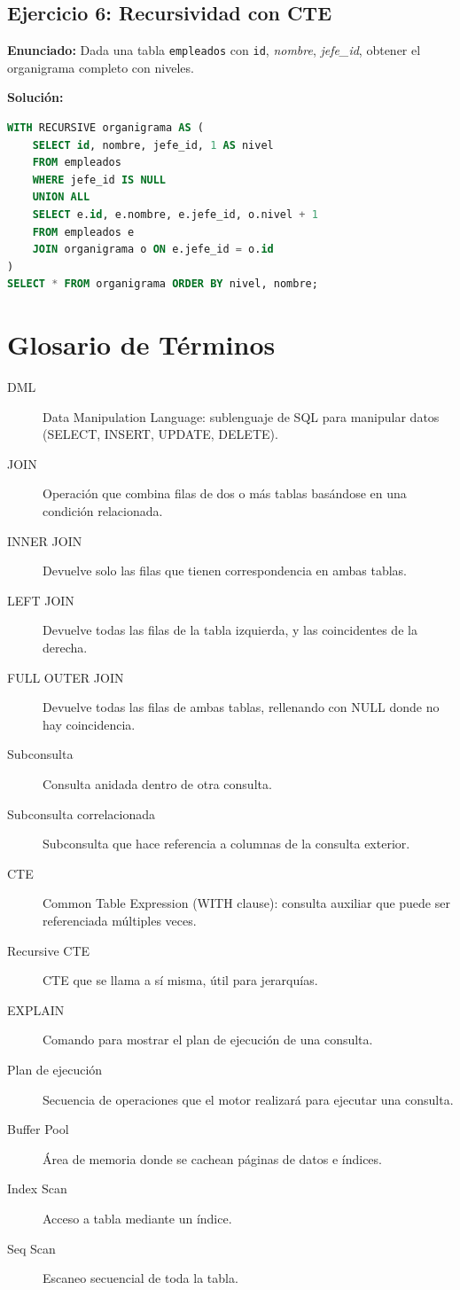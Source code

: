\documentclass[12pt,a4paper,openany,oneside]{book}
\begin{document}
\section{Ejercicio 6: Recursividad con CTE}
\textbf{Enunciado:} Dada una tabla \texttt{empleados} con \texttt{id}, \textit{nombre}, \textit{jefe\_id}, obtener el organigrama completo con niveles.

\textbf{Solución:}
\begin{lstlisting}[language=SQL]
WITH RECURSIVE organigrama AS (
    SELECT id, nombre, jefe_id, 1 AS nivel
    FROM empleados
    WHERE jefe_id IS NULL
    UNION ALL
    SELECT e.id, e.nombre, e.jefe_id, o.nivel + 1
    FROM empleados e
    JOIN organigrama o ON e.jefe_id = o.id
)
SELECT * FROM organigrama ORDER BY nivel, nombre;
\end{lstlisting}

\chapter{Glosario de Términos}
\begin{description}
    \item[DML] Data Manipulation Language: sublenguaje de SQL para manipular datos (SELECT, INSERT, UPDATE, DELETE).
    \item[JOIN] Operación que combina filas de dos o más tablas basándose en una condición relacionada.
    \item[INNER JOIN] Devuelve solo las filas que tienen correspondencia en ambas tablas.
    \item[LEFT JOIN] Devuelve todas las filas de la tabla izquierda, y las coincidentes de la derecha.
    \item[FULL OUTER JOIN] Devuelve todas las filas de ambas tablas, rellenando con NULL donde no hay coincidencia.
    \item[Subconsulta] Consulta anidada dentro de otra consulta.
    \item[Subconsulta correlacionada] Subconsulta que hace referencia a columnas de la consulta exterior.
    \item[CTE] Common Table Expression (WITH clause): consulta auxiliar que puede ser referenciada múltiples veces.
    \item[Recursive CTE] CTE que se llama a sí misma, útil para jerarquías.
    \item[EXPLAIN] Comando para mostrar el plan de ejecución de una consulta.
    \item[Plan de ejecución] Secuencia de operaciones que el motor realizará para ejecutar una consulta.
    \item[Buffer Pool] Área de memoria donde se cachean páginas de datos e índices.
    \item[Index Scan] Acceso a tabla mediante un índice.
    \item[Seq Scan] Escaneo secuencial de toda la tabla.
\end{description}
\end{document}
